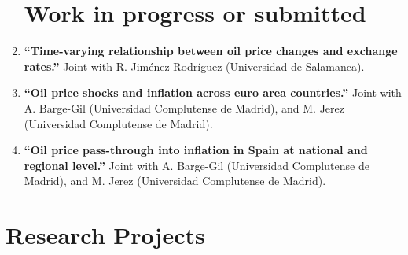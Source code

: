 \documentclass[11pt]{article}\usepackage[]{graphicx}\usepackage[]{color}
\begin{document}
\begin{enumerate}
\noindent
\section{Work in progress or submitted}

\item \textbf{``Time-varying relationship between oil price changes and exchange rates.''} Joint with R. Jiménez-Rodríguez (Universidad de Salamanca).

\item \textbf{``Oil price shocks and inflation across euro area countries.''} Joint with A. Barge-Gil (Universidad Complutense de Madrid), and M. Jerez (Universidad Complutense de Madrid).

\item \textbf{``Oil price pass-through into inflation in Spain at national and regional level.''} Joint with A. Barge-Gil (Universidad Complutense de Madrid), and M. Jerez (Universidad Complutense de Madrid).
\\
\end{enumerate}


\section{Research Projects} 
\end{document}
